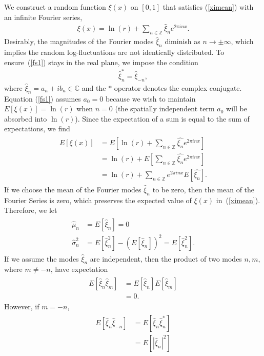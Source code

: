 We construct a random function $\xi(x)$ on $[0,1]$ that satisfies
(\ref{ximean}) with an infinite Fourier series,
\begin{align}\label{fs1}
\xi(x) = \ln(r) + \sum_{n \in \mathbb{Z}}\hat{\xi}_ne^{2\pi inx}.
\end{align}
Desirably, the magnitudes of the Fourier modes $\hat{\xi}_n$ diminish
as $n \to \pm \infty$, which implies the random log-fluctuations are
not identically distributed. To ensure~(\ref{fs1}) stays in the real plane, we impose the condition
\begin{align}\label{realcond}
\hat{\xi}_{n}^* = \hat{\xi}_{-n},
\end{align}
where $\hat{\xi}_n=a_n + ib_n \in \mathbb{C}$ and the $*$ operator denotes the complex conjugate. Equation (\ref{fs1}) assumes $a_0=0$
because we wish to maintain $E[\xi(x)]=\ln(r)$ when $n=0$ (the
spatially independent term $a_0$ will be absorbed into $\ln(r)$).
Since the expectation of a sum is equal to the sum of
expectations, we find~\cite{ross}
\begin{align*}
\begin{split}
E[\xi(x)] &= E\left[\ln(r) + \sum_{n \in \mathbb{Z}}\hat{\xi_n}e^{2\pi
  inx}\right]\\
&= \ln(r) + E\left[\sum_{n \in \mathbb{Z}}\hat{\xi_n}e^{2\pi inx}\right]\\
&= \ln(r) + \sum_{n \in \mathbb{Z}}e^{2\pi inx}E[\hat{\xi_n}].
\end{split}
\end{align*}
If we choose the mean of the Fourier modes $\hat{\xi}_n$ to be zero,
then the mean of the Fourier Series is zero, which preserves the expected value of $\xi(x)$ in~(\ref{ximean}). Therefore, we let
\begin{align}
\begin{split}\label{xihatmean}
\hat{\mu}_n&=E[\hat{\xi}_n]=0\\
\hat{\sigma}_n^2&=E[\hat{\xi}_n^2]-(E[\hat{\xi}_n])^2=E[\hat{\xi}_n^2].
\end{split}
\end{align}
If we assume the modes $\hat{\xi}_n$ are independent, then the product of
two modes $n,m$, where $m \neq -n$, have expectation
\begin{align*}
\begin{split}
E[\hat{\xi}_n\hat{\xi}_m]&=E[\hat{\xi}_n]E[\hat{\xi}_m]\\
&=0.
\end{split}
\end{align*}
However, if $m=-n$, 
\begin{align*}
\begin{split}
E[\hat{\xi}_n\hat{\xi}_{-n}]&= E[\hat{\xi}_n\hat{\xi}_n^*]\\
&=E[|\hat{\xi}_n|^2]
\end{split}
\end{align*}
